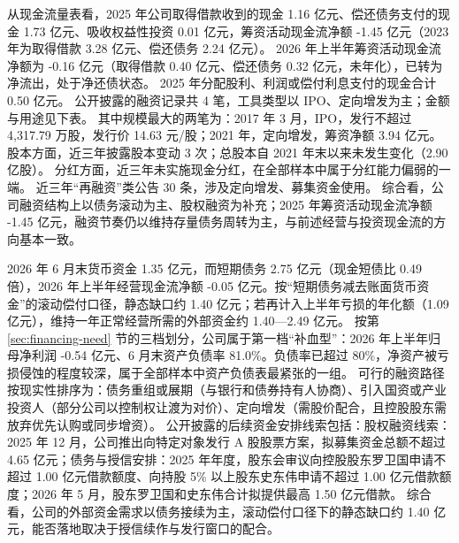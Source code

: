 从现金流量表看，2025 年公司取得借款收到的现金 1.16 亿元、偿还债务支付的现金 1.73 亿元、吸收权益性投资 0.01 亿元，筹资活动现金流净额 -1.45 亿元（2023 年为取得借款 3.28 亿元、偿还债务 2.24 亿元）。 2026 年上半年筹资活动现金流净额为 -0.16 亿元（取得借款 0.40 亿元、偿还债务 0.32 亿元，未年化），已转为净流出，处于净还债状态。 2025 年分配股利、利润或偿付利息支付的现金合计 0.50 亿元。 公开披露的融资记录共 4 笔，工具类型以 IPO、定向增发为主；金额与用途见下表。 其中规模最大的两笔为：2017 年 3 月，IPO，发行不超过 4,317.79 万股，发行价 14.63 元/股；2021 年，定向增发，筹资净额 3.94 亿元。 股本方面，近三年披露股本变动 3 次；总股本自 2021 年末以来未发生变化（2.90 亿股）。 分红方面，近三年未实施现金分红，在全部样本中属于分红能力偏弱的一端。 近三年“再融资”类公告 30 条，涉及定向增发、募集资金使用。 综合看，公司融资结构上以债务滚动为主、股权融资为补充；2025 年筹资活动现金流净额 -1.45 亿元，融资节奏仍以维持存量债务周转为主，与前述经营与投资现金流的方向基本一致。

 2026 年 6 月末货币资金 1.35 亿元，而短期债务 2.75 亿元（现金短债比 0.49 倍），2026 年上半年经营现金流净额 -0.05 亿元。按“短期债务减去账面货币资金”的滚动偿付口径，静态缺口约 1.40 亿元；若再计入上半年亏损的年化额（1.09 亿元），维持一年正常经营所需的外部资金约 1.40---2.49 亿元。 按第 \ref{sec:financing-need} 节的三档划分，公司属于第一档“补血型”：2026 年上半年归母净利润 -0.54 亿元、6 月末资产负债率 81.0\%。负债率已超过 80\%，净资产被亏损侵蚀的程度较深，属于全部样本中资产负债表最紧张的一组。 可行的融资路径按现实性排序为：债务重组或展期（与银行和债券持有人协商）、引入国资或产业投资人（部分公司以控制权让渡为对价）、定向增发（需股价配合，且控股股东需放弃优先认购或同步增资）。 公开披露的后续资金安排线索包括：股权融资线索：2025 年 12 月，公司推出向特定对象发行 A 股股票方案，拟募集资金总额不超过 4.65 亿元；债务与授信安排：2025 年年度，股东会审议向控股股东罗卫国申请不超过 1.00 亿元借款额度、向持股 5\% 以上股东史东伟申请不超过 1.00 亿元借款额度；2026 年 5 月，股东罗卫国和史东伟合计拟提供最高 1.50 亿元借款。 综合看，公司的外部资金需求以债务接续为主，滚动偿付口径下的静态缺口约 1.40 亿元，能否落地取决于授信续作与发行窗口的配合。




